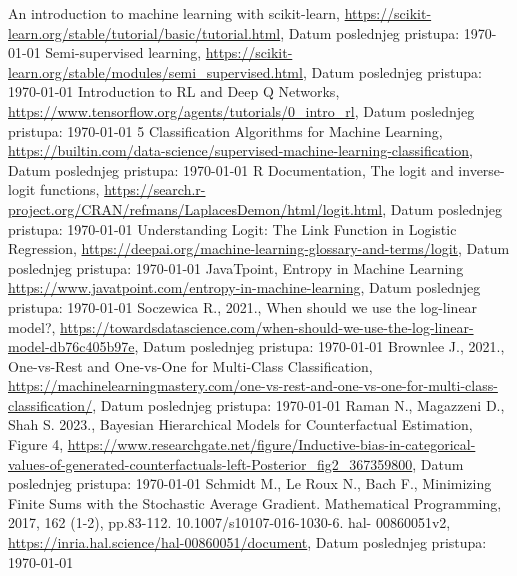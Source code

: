 \documentclass[fontsize=12bp, paper=a4]{scrarticle}
\begin{document}
\begin{thebibliography}{1}
  An introduction to machine learning with scikit-learn, \url{https://scikit-learn.org/stable/tutorial/basic/tutorial.html}, Datum poslednjeg pristupa: \today
  Semi-supervised learning, \url{https://scikit-learn.org/stable/modules/semi_supervised.html}, Datum poslednjeg pristupa: \today
  Introduction to RL and Deep Q Networks, \url{https://www.tensorflow.org/agents/tutorials/0_intro_rl}, Datum poslednjeg pristupa: \today
  5 Classification Algorithms for Machine Learning, \url{https://builtin.com/data-science/supervised-machine-learning-classification}, Datum poslednjeg pristupa: \today
    R Documentation, The logit and inverse-logit functions, \url{https://search.r-project.org/CRAN/refmans/LaplacesDemon/html/logit.html}, Datum poslednjeg pristupa: \today
    Understanding Logit: The Link Function in Logistic Regression, \url{https://deepai.org/machine-learning-glossary-and-terms/logit}, Datum poslednjeg pristupa: \today
    JavaTpoint, Entropy in Machine Learning \url{https://www.javatpoint.com/entropy-in-machine-learning}, Datum poslednjeg pristupa: \today
    Soczewica R., 2021., When should we use the log-linear model?, \url{https://towardsdatascience.com/when-should-we-use-the-log-linear-model-db76c405b97e}, Datum poslednjeg pristupa: \today
    Brownlee J., 2021., One-vs-Rest and One-vs-One for Multi-Class Classification, \url{https://machinelearningmastery.com/one-vs-rest-and-one-vs-one-for-multi-class-classification/}, Datum poslednjeg pristupa: \today
    Raman N., Magazzeni D., Shah S. 2023., Bayesian Hierarchical Models for Counterfactual Estimation, Figure 4, \url{https://www.researchgate.net/figure/Inductive-bias-in-categorical-values-of-generated-counterfactuals-left-Posterior_fig2_367359800}, Datum poslednjeg pristupa: \today
    Schmidt M.,  Le Roux N.,  Bach F., Minimizing Finite Sums with the Stochastic Average
Gradient. Mathematical Programming, 2017, 162 (1-2), pp.83-112. 10.1007/s10107-016-1030-6. hal-
00860051v2, \url{https://inria.hal.science/hal-00860051/document}, Datum poslednjeg pristupa: \today

\end{thebibliography}
\end{document}
